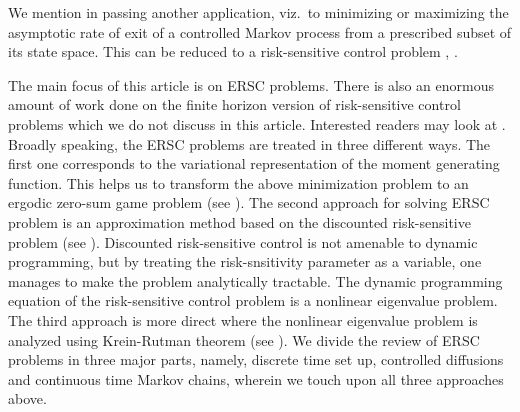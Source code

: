 \documentclass[notitlepage,11pt,reqno]{amsart}
\numberwithin{equation}{section}
\theoremstyle{plain}
\theoremstyle{definition}
\theoremstyle{remark}
\begin{document}
We mention in passing another application, viz.\ to minimizing or maximizing the asymptotic rate of exit of a controlled Markov process from a prescribed subset of its state space. This can be reduced to a risk-sensitive control problem \cite{BBEigen}, \cite{BFilar}.

The main focus of this article is on ERSC problems. There is also an enormous amount of 
work done on the finite horizon version of risk-sensitive control problems which we do not discuss in this article. Interested readers
may look at \cites{Bensoussan-95a,MR3286649,MR3625748,MR3173005,Bensoussan-03,Bensoussan=-95b,Bensoussan-96,Jaskiewicz-14,Whit-81}.
Broadly speaking, the ERSC problems are treated in three different ways.
The first one corresponds to the variational representation of the moment
generating function. This helps us to transform the above minimization problem to an ergodic zero-sum game problem (see \cites{MR3900793,Fleming-95a,Fleming-91,Fleming-97a}). 
 The second approach for solving 
ERSC problem is an approximation method based on the discounted risk-sensitive problem
(see \cites{DiMasi-99b,MR2174017,MR2799396}). Discounted risk-sensitive control is not amenable to dynamic programming, but by treating the risk-snsitivity parameter as a variable, one manages to make the problem analytically tractable. The dynamic programming equation of the risk-sensitive control problem is a 
nonlinear eigenvalue problem. The third approach is
more direct where the nonlinear eigenvalue problem is analyzed using
Krein-Rutman theorem (see \cites{MR3926044,MR2808061,MR3629428}). We divide the review of ERSC problems
 in three major parts, namely, discrete time set up, controlled diffusions and  continuous time Markov chains, wherein we touch upon all three approaches above. 


\vspace{.2in}
\end{document}
